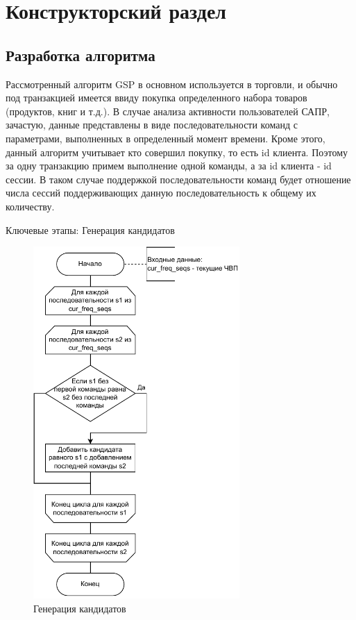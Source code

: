 \chapter{Конструкторский раздел}
\label{cha:design}

\section{Разработка алгоритма}
Рассмотренный алгоритм GSP в основном используется в торговли, и обычно под транзакцией имеется ввиду покупка определенного набора товаров (продуктов, книг и т.д.). В случае анализа активности пользователей САПР, зачастую, данные представлены в виде последовательности команд с параметрами, выполненных в определенный момент времени. Кроме этого, данный алгоритм учитывает кто совершил покупку, то есть id клиента.
Поэтому за одну транзакцию примем выполнение одной команды, а за id клиента - id сессии. В таком случае поддержкой последовательности команд будет отношение числа сессий поддерживающих данную последовательность к общему их количеству. 

Ключевые этапы:
Генерация кандидатов

\begin{figure}[h!]
	\centering
	\includegraphics[width=0.7\textwidth]{inc/img/generateCandidates.drawio.pdf}
	\caption{Генерация кандидатов}
	\label{generateCandidates}
\end{figure}


